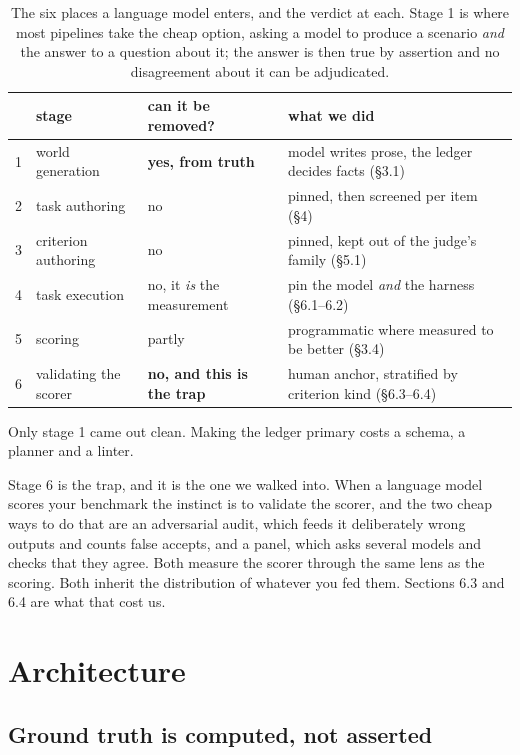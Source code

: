 \documentclass[11pt]{article}
\begin{document}
\begin{table}[tb]
\centering
\small
\begin{tabular}{@{}r >{\raggedright\arraybackslash}p{34mm} >{\raggedright\arraybackslash}p{27mm} >{\raggedright\arraybackslash}p{45mm}@{}}
\toprule
& stage & can it be removed? & what we did\\
\midrule
1 & world generation & \textbf{yes, from truth} & model writes prose, the ledger decides facts (\S3.1)\\
2 & task authoring & no & pinned, then screened per item (\S4)\\
3 & criterion authoring & no & pinned, kept out of the judge's family (\S5.1)\\
4 & task execution & no, it \emph{is} the measurement & pin the model \emph{and} the harness (\S6.1--6.2)\\
5 & scoring & partly & programmatic where measured to be better (\S3.4)\\
6 & validating the scorer & \textbf{no, and this is the trap} & human anchor, stratified by criterion kind (\S6.3--6.4)\\
\bottomrule
\end{tabular}
\caption{The six places a language model enters, and the verdict at each.
Stage 1 is where most pipelines take the cheap option, asking a model to
produce a scenario \emph{and} the answer to a question about it; the answer is
then true by assertion and no disagreement about it can be adjudicated.}
\label{tab:entry}
\end{table}

Only stage 1 came out clean. Making the ledger primary costs a schema, a
planner and a linter.

Stage 6 is the trap, and it is the one we walked into. When a language model
scores your benchmark \cite{judge} the instinct is to validate the scorer, and
the two cheap ways to do that are an adversarial audit, which feeds it deliberately
wrong outputs and counts false accepts, and a panel, which asks several models
and checks that they agree. Both measure the scorer through the same lens as
the scoring. Both inherit the distribution of whatever you fed them. Sections
6.3 and 6.4 are what that cost us.

\section{Architecture}

\subsection{Ground truth is computed, not asserted}
\end{document}
